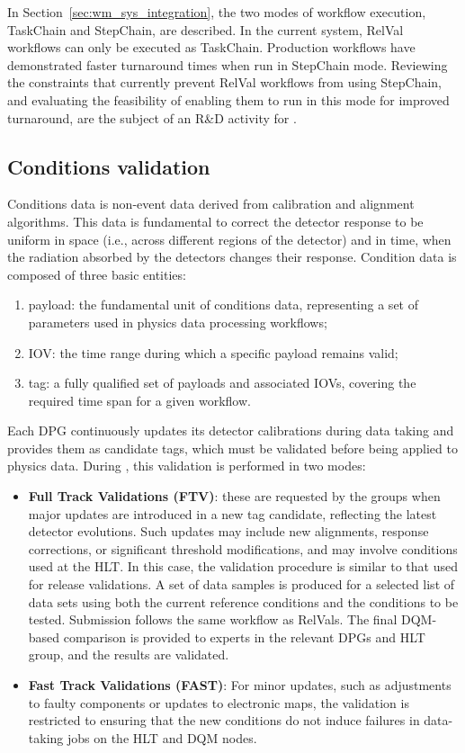 In Section~\ref{sec:wm_sys_integration}, the two modes of workflow execution, TaskChain and StepChain, are described. In the current \RunThree system, \gls{RelVal} workflows can only be executed as TaskChain. Production workflows have demonstrated faster turnaround times when run in StepChain mode. Reviewing the constraints that currently prevent \gls{RelVal} workflows from using StepChain, and evaluating the feasibility of enabling them to run in this mode for improved turnaround, are the subject of an R\&D activity for \PhaseTwo.

\subsection {Conditions validation}
Conditions data is non-event data derived from calibration and alignment algorithms. This data is fundamental to correct the detector response to be uniform in space (i.e., across different regions of the detector) and in time, when the radiation absorbed by the detectors changes their response. Condition data is composed of three basic entities:
\begin{enumerate}
    \item payload: the fundamental unit of conditions data, representing a set of parameters used in physics data processing workflows;
    \item \gls{IOV}: the time range during which a specific payload remains valid;
    \item tag: a fully qualified set of payloads and associated \glspl{IOV}, covering the required time span for a given workflow.
\end{enumerate}

Each \gls{DPG} continuously updates its detector calibrations during data taking and provides them as candidate tags, which must be validated before being applied to physics data. During \RunThree, this validation is performed in two modes:
\begin{itemize}
    \item \textbf{Full Track Validations (FTV)}: these are requested by the groups when major updates are introduced in a new tag candidate, reflecting the latest detector evolutions. Such updates may include new alignments, response corrections, or significant threshold modifications, and may involve conditions used at the \gls{HLT}. In this case, the validation procedure is similar to that used for release validations. A set of data samples is produced for a selected list of data sets using both the current reference conditions and the conditions to be tested. Submission follows the same workflow as \glspl{RelVal}. The final \gls{DQM}-based comparison is provided to experts in the relevant \glspl{DPG} and \gls{HLT} group, and the results are validated.
    \item \textbf{Fast Track Validations (FAST)}: For minor updates, such as adjustments to faulty components or updates to electronic maps, the validation is restricted to ensuring that the new conditions do not induce failures in data-taking jobs on the \gls{HLT} and \gls{DQM} nodes.
\end{itemize}

